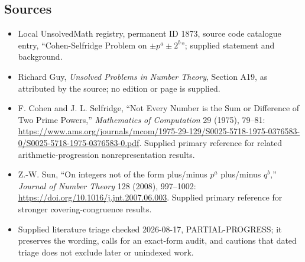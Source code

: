 \documentclass[11pt]{article}
\begin{document}
\subsection{Sources}
\begin{itemize}
\item Local UnsolvedMath registry, permanent ID 1873, source code catalogue entry, ``Cohen-Selfridge Problem on $\pm p^a\pm2^b$''; supplied statement and background.
\item Richard Guy, \emph{Unsolved Problems in Number Theory}, Section A19, as attributed by the source; no edition or page is supplied.
\item F. Cohen and J. L. Selfridge, ``Not Every Number is the Sum or Difference of Two Prime Powers,'' \emph{Mathematics of Computation} 29 (1975), 79--81: \url{https://www.ams.org/journals/mcom/1975-29-129/S0025-5718-1975-0376583-0/S0025-5718-1975-0376583-0.pdf}. Supplied primary reference for related arithmetic-progression nonrepresentation results.
\item Z.-W. Sun, ``On integers not of the form plus/minus $p^a$ plus/minus $q^b$,'' \emph{Journal of Number Theory} 128 (2008), 997--1002: \url{https://doi.org/10.1016/j.jnt.2007.06.003}. Supplied primary reference for stronger covering-congruence results.
\item Supplied literature triage checked 2026-08-17, PARTIAL-PROGRESS; it preserves the wording, calls for an exact-form audit, and cautions that dated triage does not exclude later or unindexed work.
\end{itemize}
\end{document}
